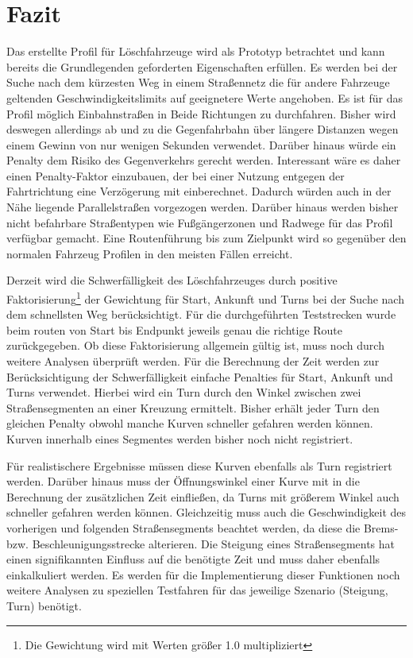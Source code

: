 \documentclass[12pt,a4paper]{article}
\begin{document}
\newpage
\section{Fazit}

Das erstellte Profil für Löschfahrzeuge wird als Prototyp betrachtet und kann bereits die Grundlegenden geforderten Eigenschaften erfüllen. Es werden bei der Suche nach dem kürzesten Weg in einem Straßennetz die für andere Fahrzeuge geltenden Geschwindigkeitslimits auf geeignetere Werte angehoben. 
Es ist für das Profil möglich Einbahnstraßen in Beide Richtungen zu durchfahren. Bisher wird deswegen allerdings ab und zu die Gegenfahrbahn über längere Distanzen wegen einem Gewinn von nur wenigen Sekunden verwendet. Darüber hinaus würde ein Penalty dem Risiko des Gegenverkehrs gerecht werden. Interessant wäre es daher einen Penalty-Faktor einzubauen, der bei einer Nutzung entgegen der Fahrtrichtung eine Verzögerung mit einberechnet. Dadurch würden auch in der Nähe liegende Parallelstraßen vorgezogen werden.
Darüber hinaus werden bisher nicht befahrbare Straßentypen wie Fußgängerzonen und Radwege für das Profil verfügbar gemacht. Eine Routenführung bis zum Zielpunkt wird so gegenüber den normalen Fahrzeug Profilen in den meisten Fällen erreicht.

Derzeit wird die Schwerfälligkeit des Löschfahrzeuges durch positive Faktorisierung\footnote{Die Gewichtung wird mit Werten größer 1.0 multipliziert} der Gewichtung für Start, Ankunft und Turns bei der Suche nach dem schnellsten Weg berücksichtigt. Für die durchgeführten Teststrecken wurde beim routen von Start bis Endpunkt jeweils genau die richtige Route zurückgegeben. Ob diese Faktorisierung allgemein gültig ist, muss noch durch weitere Analysen überprüft werden.
Für die Berechnung der Zeit werden zur Berücksichtigung der Schwerfälligkeit einfache Penalties für Start, Ankunft und Turns verwendet. Hierbei wird ein Turn durch den Winkel zwischen zwei Straßensegmenten an einer Kreuzung ermittelt. Bisher erhält jeder Turn den gleichen Penalty obwohl manche Kurven schneller gefahren werden können. Kurven innerhalb eines Segmentes werden bisher noch nicht registriert.

Für realistischere Ergebnisse müssen diese Kurven ebenfalls als Turn registriert werden. Darüber hinaus muss der Öffnungswinkel einer Kurve mit in die Berechnung der zusätzlichen Zeit einfließen, da Turns mit größerem Winkel auch schneller gefahren werden können. Gleichzeitig muss auch die Geschwindigkeit des vorherigen und folgenden Straßensegments beachtet werden, da diese die Brems- bzw. Beschleunigungsstrecke alterieren.
Die Steigung eines Straßensegments hat einen signifikannten Einfluss auf die benötigte Zeit und muss daher ebenfalls einkalkuliert werden.
Es werden für die Implementierung dieser Funktionen noch weitere Analysen zu speziellen Testfahren für das jeweilige Szenario (Steigung, Turn) benötigt.
\end{document}
